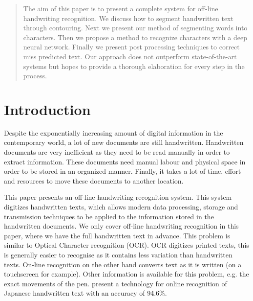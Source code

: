 \documentclass{article}
\begin{document}
\begin{abstract}
The aim of this paper is to present a complete system for off-line handwriting recognition.
We discuss how to segment handwritten text through contouring. Next we present our method of segmenting words into characters.
Then we propose a method to recognize characters with a deep neural network.
Finally we present post processing techniques to correct miss predicted text.
Our approach does not outperform state-of-the-art systems but hopes to provide a thorough elaboration for every step in the process.
\end{abstract}

\section{Introduction}
Despite the exponentially increasing amount of digital information in the contemporary world, a lot of new documents are still handwritten.
Handwritten documents are very inefficient as they need to be read manually in order to extract information.
These documents need manual labour and physical space in order to be stored in an organized manner.
Finally, it takes a lot of time, effort and resources to move these documents to another location.

This paper presents an off-line handwriting recognition system. This system digitizes handwritten texts, which allows modern data processing, storage and transmission techniques to be applied to the information stored in the handwritten documents.
We only cover off-line handwriting recognition in this paper, where we have the full handwritten text in advance. This problem is similar to Optical Character recognition (OCR). OCR digitizes printed texts, this is generally easier to recognise as it contains less variation than handwritten texts.
On-line recognition on the other hand converts text as it is written (on a touchscreen for example). Other information is available for this problem, e.g. the exact movements of the pen. \cite{olcr} present a technology for online recognition of Japanese handwritten text with an accuracy of 94.6\%.
\end{document}
